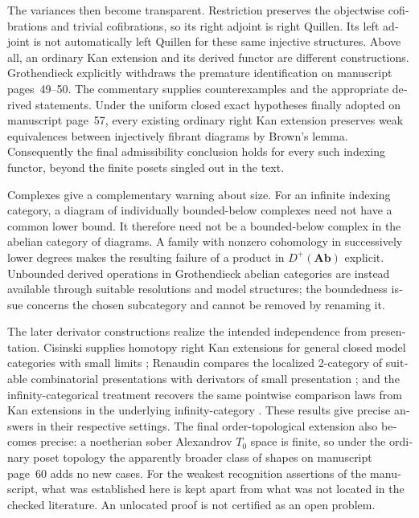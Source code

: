 \begin{otherlanguage}{english}
The variances then become transparent. Restriction preserves the
objectwise cofibrations and trivial cofibrations, so its right adjoint is
right Quillen. Its left adjoint is not automatically left Quillen for these
same injective structures. Above all, an ordinary Kan extension and its
derived functor are different constructions. Grothendieck explicitly
withdraws the premature identification on manuscript pages~49--50. The
commentary supplies counterexamples and the appropriate derived statements.
Under the uniform closed exact hypotheses finally adopted on manuscript
page~57, every existing ordinary right Kan extension preserves weak
equivalences between injectively fibrant diagrams by Brown's lemma.
Consequently the final admissibility conclusion holds for every such
indexing functor, beyond the finite posets singled out in the text.

Complexes give a complementary warning about size. For an infinite
indexing category, a diagram of individually bounded-below complexes need
not have a common lower bound. It therefore need not be a bounded-below
complex in the abelian category of diagrams. A family with nonzero
cohomology in successively lower degrees makes the resulting failure of a
product in $D^+(\mathbf{Ab})$ explicit. Unbounded derived operations in
Grothendieck abelian categories are instead available through suitable
resolutions and model structures; the boundedness issue concerns the
chosen subcategory and cannot be removed by renaming it.

The later derivator constructions realize the intended independence from
presentation. Cisinski supplies homotopy right Kan extensions for general
closed model categories with small limits
\citep[Theorem~6.11]{Cisinski2003}; Renaudin compares the localized
2-category of suitable combinatorial presentations with derivators of
small presentation \citep[Theorems~3.3.2 and~3.4.4]{Renaudin2009}; and the
infinity-categorical treatment recovers the same pointwise comparison
laws from Kan extensions in the underlying infinity-category
\citep[Proposition~5.3.9 and Remark~5.3.10]{RiehlVerity2017}. These results
give precise answers in their respective settings. The final
order-topological extension also becomes precise: a noetherian sober
Alexandrov $T_0$ space is finite, so under the ordinary poset topology the
apparently broader class of shapes on manuscript page~60 adds no new cases.
For the weakest recognition assertions of the manuscript, what was
established here is kept apart from what was not located in the checked
literature. An unlocated proof is not certified as an open problem.
\end{otherlanguage}
\dgrchunkend
